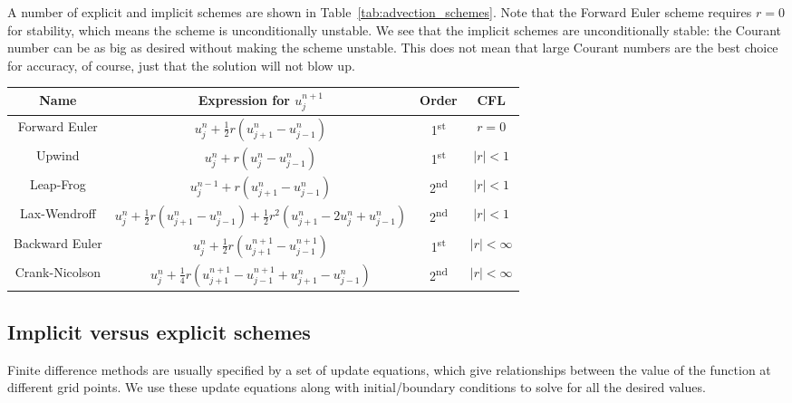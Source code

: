 \documentclass[twocolumn]{myarticle}
\begin{document}
A number of explicit and implicit schemes are shown in Table~\ref{tab:advection_schemes}.
Note that the Forward Euler scheme requires $ r = 0 $ for stability, which means the scheme is unconditionally unstable.
We see that the implicit schemes are unconditionally stable: the Courant number can be as big as desired without making the scheme unstable.
This does not mean that large Courant numbers are the best choice for accuracy, of course, just that the solution will not blow up.

\begin{table*}[ht]
    \centering
    \begin{tabular}{cccc}
        \toprule
        Name & Expression for $ u^{n+1}_j $ & Order & CFL 
        \\
        \midrule
        Forward Euler & $ u^n_j + \frac{1}{2} r \left(u^{n}_{j+1} - u^{n}_{j-1}\right) $ & 1\textsuperscript{st} & $ r = 0 $ 
        \\[1.5ex]
        Upwind & $ u^n_j + r \left(u^{n}_{j} - u^{n}_{j-1}\right) $ & 1\textsuperscript{st} & $ |r| < 1 $ 
        \\[1.5ex]
        Leap-Frog & $ u^{n-1}_j + r \left(u^{n}_{j+1} - u^{n}_{j-1}\right) $ & 2\textsuperscript{nd} & $ |r| < 1 $ 
        \\[1.5ex]
    Lax-Wendroff & $ u^n_j + \frac{1}{2} r \left(u^{n}_{j+1} - u^{n}_{j-1}\right) + \frac{1}{2} r^2 \left(u^{n}_{j+1} - 2 u^n_j + u^{n}_{j-1}\right) $ & 2\textsuperscript{nd} & $ |r| < 1 $ 
        \\[1.5ex]
        \midrule
        Backward Euler & $ u^n_j + \frac{1}{2} r \left(u^{n+1}_{j+1} - u^{n+1}_{j-1}\right) $ & 1\textsuperscript{st} & $ |r| < \infty $ 
        \\[1.5ex]
        Crank-Nicolson & $ u^n_j + \frac{1}{4} r \left( u^{n+1}_{j+1} - u^{n+1}_{j-1} + u^{n}_{j+1} - u^{n}_{j-1}\right) $ & 2\textsuperscript{nd} & $ |r| < \infty $ 
        \\[1.5ex]
        \bottomrule
    \end{tabular}
    \caption{Finite difference schemes for the advection equation.}
    \label{tab:advection_schemes}
\end{table*}

\subsection{Implicit versus explicit schemes}
\label{subsec:implicit_versus_explicit_schemes}

Finite difference methods are usually specified by a set of update equations, which give relationships between the value of the function at different grid points.
We use these update equations along with initial/boundary conditions to solve for all the desired values.
\end{document}
